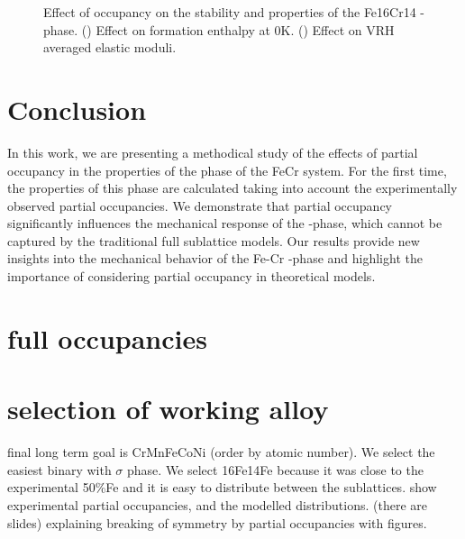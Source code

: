 \documentclass[superscriptaddress, 12pt]{revtex4-2}%
\begin{document}
\begin{figure}
 \caption{\protect\label{fig:OccupancyEffect}
   Effect of occupancy on the stability and properties of the Fe16Cr14 \textsigma-phase.
   () Effect on formation enthalpy at 0K.
   () Effect on VRH averaged elastic moduli.
 }

\end{figure}

\section{Conclusion}
In this work, we are presenting a methodical study of the effects of partial occupancy in the properties of the \textsigma phase of the FeCr system.
For the first time, the properties of this phase are calculated taking into account the experimentally observed partial occupancies.
We demonstrate that partial occupancy significantly influences the mechanical response of the \textsigma-phase, which cannot be captured by the traditional full sublattice models.
Our results provide new insights into the mechanical behavior of the Fe-Cr \textsigma-phase and highlight the importance of considering partial occupancy in theoretical models.


\section{full occupancies}

\section{selection of working alloy}
final long term goal is CrMnFeCoNi (order by atomic number).
We select the easiest binary with $\sigma$ phase.
We select 16Fe14Fe because it was close to the experimental 50\%Fe and it is easy to distribute between the sublattices.
show experimental partial occupancies, and the modelled distributions.
(there are slides)
explaining breaking of symmetry by partial occupancies with figures.


 
\end{document}
